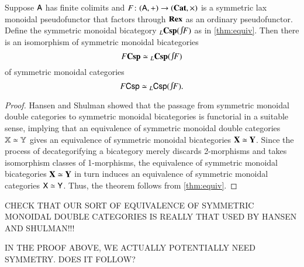 \documentclass[reqno]{amsart}
\begin{document}
\begin{thm} \label{thm:bicat_equiv}
Suppose $\mathsf{A}$ has finite colimits and $F \colon(\mathsf{A},+) \to (\mathbf{Cat},\times)$ is a symmetric lax monoidal pseudofunctor that factors through $\mathbf{Rex}$ as an ordinary pseudofunctor.    Define the symmetric monoidal bicategory $_L\bCsp(\inta F)$ as in \cref{thm:equiv}.   Then there is an isomorphism of symmetric monoidal bicategories
\[      F\bCsp \simeq {}_L \bCsp(\inta F)   \]
of symmetric monoidal categories
\[      F\Csp \simeq {}_L \Csp(\inta F)  . \]
\end{thm}

\begin{proof} Hansen and Shulman \cite{HS} showed that the passage from symmetric monoidal double categories to symmetric monoidal bicategories is  functorial in a suitable sense, implying
that an equivalence of symmetric monoidal double categories $\mathbf{\mathbb X} \simeq \mathbf{\mathbb Y}$ gives an equivalence of symmetric monoidal bicategories $\mathbf{X} \simeq \mathbf{Y}$.    Since the process of decategorifying a bicategory merely discards 2-morphisms and takes isomorphism classes of 1-morphisms, the equivalence of symmetric monoidal bicategories $\mathbf{X} \simeq \mathbf{Y}$ in turn induces an equivalence of symmetric monoidal categories $\mathsf{X} \simeq \mathsf{Y}$.   Thus, the theorem follows from \cref{thm:equiv}. \end{proof}

CHECK THAT OUR SORT OF EQUIVALENCE OF SYMMETRIC MONOIDAL DOUBLE CATEGORIES IS REALLY THAT USED BY HANSEN AND SHULMAN!!!

IN THE PROOF ABOVE, WE ACTUALLY POTENTIALLY NEED SYMMETRY. DOES IT FOLLOW?
\end{document}
